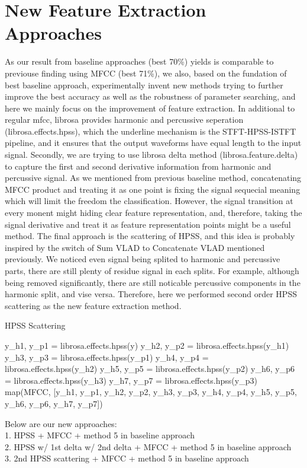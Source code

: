\documentclass[final]{siamltexmm}
\begin{document}
\section{New Feature Extraction Approaches}
As our result from baseline approaches (best 70\%) yields is comparable to previouse finding using MFCC (best 71\%), we also, based on the fundation of best baseline approach, experimentally invent new methods trying to further improve the best accuracy as well as the robustness of parameter searching, and here we mainly focus on the improvement of feature extraction. In additional to regular mfcc, librosa provides harmonic and percussive seperation (librosa.effects.hpss), which the underline mechanism is the STFT-HPSS-ISTFT pipeline, and it ensures that the output waveforms have equal length to the input signal. Secondly, we are trying to use librosa delta method (librosa.feature.delta) to capture the first and second derivative information from harmonic and percussive signal. As we mentioned from previous baseline method, concatenating MFCC product and treating it as one point is fixing the signal sequecial meaning which will limit the freedom the classification. However, the signal transition at every monent might hiding clear feature representation, and, therefore, taking the signal derivative and treat it as feature representation points might be a useful method. The final approach is the scattering of HPSS, and this idea is probably inspired by the switch of Sum VLAD to Concatenate VLAD mentioned previously. We noticed even signal being splited to harmonic and percussive parts, there are still plenty of residue signal in each splits. For example, although being removed significantly, there are still noticable percussive components in the harmonic split, and vise versa. Therefore, here we performed second order HPSS scattering as the new feature extraction method.

\begin{algorithm}[htb]
  \caption{HPSS Scattering}
  \label{algo:SC}
\begin{algorithmic}[1]
    \STATE y\_h1, y\_p1 = librosa.effects.hpss(y)
    \STATE y\_h2, y\_p2 = librosa.effects.hpss(y\_h1)
    \STATE y\_h3, y\_p3 = librosa.effects.hpss(y\_p1)
    \STATE y\_h4, y\_p4 = librosa.effects.hpss(y\_h2)
    \STATE y\_h5, y\_p5 = librosa.effects.hpss(y\_p2)
    \STATE y\_h6, y\_p6 = librosa.effects.hpss(y\_h3)
    \STATE y\_h7, y\_p7 = librosa.effects.hpss(y\_p3)
    \STATE map(MFCC, [y\_h1, y\_p1, y\_h2, y\_p2, y\_h3, y\_p3, y\_h4, y\_p4, y\_h5, y\_p5, y\_h6, y\_p6, y\_h7, y\_p7])
  \ENDFOR
\end{algorithmic}
\end{algorithm}
Below are our new approaches:
\\ 1. HPSS + MFCC + method 5 in baseline approach
\\ 2. HPSS w/ 1st delta w/ 2nd delta + MFCC + method 5 in baseline approach
\\ 3. 2nd HPSS scattering + MFCC + method 5 in baseline approach
\\
\end{document}
